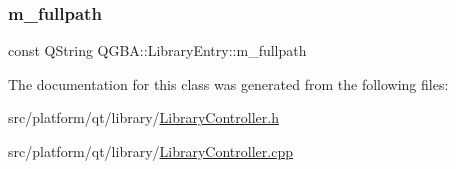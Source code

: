 \subsubsection{\texorpdfstring{m\+\_\+fullpath}{m\_fullpath}}
{\footnotesize\ttfamily const Q\+String Q\+G\+B\+A\+::\+Library\+Entry\+::m\+\_\+fullpath\hspace{0.3cm}{\ttfamily [private]}}



The documentation for this class was generated from the following files\+:\begin{DoxyCompactItemize}
\item 
src/platform/qt/library/\mbox{\hyperlink{_library_controller_8h}{Library\+Controller.\+h}}\item 
src/platform/qt/library/\mbox{\hyperlink{_library_controller_8cpp}{Library\+Controller.\+cpp}}\end{DoxyCompactItemize}
